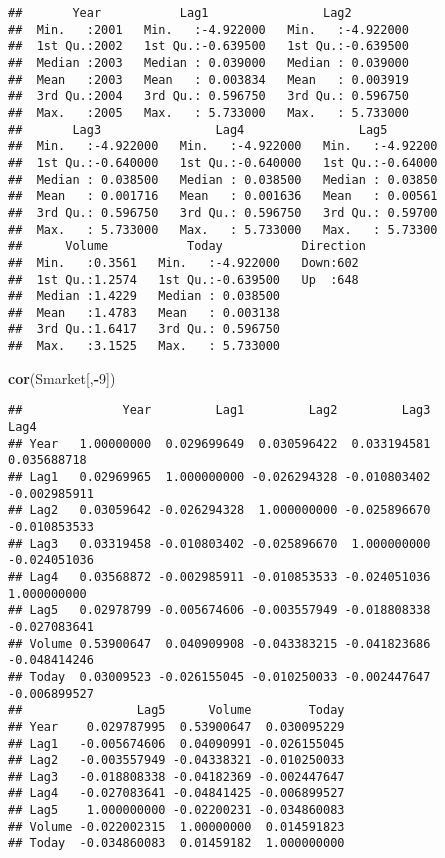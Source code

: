 \documentclass[]{article}
\newenvironment{Shaded}{\begin{snugshade}}{\end{snugshade}}
\newcommand{\KeywordTok}[1]{\textcolor[rgb]{0.13,0.29,0.53}{\textbf{#1}}}
\newcommand{\DecValTok}[1]{\textcolor[rgb]{0.00,0.00,0.81}{#1}}
\newcommand{\OperatorTok}[1]{\textcolor[rgb]{0.81,0.36,0.00}{\textbf{#1}}}
\newcommand{\NormalTok}[1]{#1}
\begin{document}
\begin{verbatim}
##       Year           Lag1                Lag2          
##  Min.   :2001   Min.   :-4.922000   Min.   :-4.922000  
##  1st Qu.:2002   1st Qu.:-0.639500   1st Qu.:-0.639500  
##  Median :2003   Median : 0.039000   Median : 0.039000  
##  Mean   :2003   Mean   : 0.003834   Mean   : 0.003919  
##  3rd Qu.:2004   3rd Qu.: 0.596750   3rd Qu.: 0.596750  
##  Max.   :2005   Max.   : 5.733000   Max.   : 5.733000  
##       Lag3                Lag4                Lag5         
##  Min.   :-4.922000   Min.   :-4.922000   Min.   :-4.92200  
##  1st Qu.:-0.640000   1st Qu.:-0.640000   1st Qu.:-0.64000  
##  Median : 0.038500   Median : 0.038500   Median : 0.03850  
##  Mean   : 0.001716   Mean   : 0.001636   Mean   : 0.00561  
##  3rd Qu.: 0.596750   3rd Qu.: 0.596750   3rd Qu.: 0.59700  
##  Max.   : 5.733000   Max.   : 5.733000   Max.   : 5.73300  
##      Volume           Today           Direction 
##  Min.   :0.3561   Min.   :-4.922000   Down:602  
##  1st Qu.:1.2574   1st Qu.:-0.639500   Up  :648  
##  Median :1.4229   Median : 0.038500             
##  Mean   :1.4783   Mean   : 0.003138             
##  3rd Qu.:1.6417   3rd Qu.: 0.596750             
##  Max.   :3.1525   Max.   : 5.733000
\end{verbatim}

\begin{Shaded}
\begin{Highlighting}[]
\KeywordTok{cor}\NormalTok{(Smarket[,}\OperatorTok{-}\DecValTok{9}\NormalTok{])}
\end{Highlighting}
\end{Shaded}

\begin{verbatim}
##              Year         Lag1         Lag2         Lag3         Lag4
## Year   1.00000000  0.029699649  0.030596422  0.033194581  0.035688718
## Lag1   0.02969965  1.000000000 -0.026294328 -0.010803402 -0.002985911
## Lag2   0.03059642 -0.026294328  1.000000000 -0.025896670 -0.010853533
## Lag3   0.03319458 -0.010803402 -0.025896670  1.000000000 -0.024051036
## Lag4   0.03568872 -0.002985911 -0.010853533 -0.024051036  1.000000000
## Lag5   0.02978799 -0.005674606 -0.003557949 -0.018808338 -0.027083641
## Volume 0.53900647  0.040909908 -0.043383215 -0.041823686 -0.048414246
## Today  0.03009523 -0.026155045 -0.010250033 -0.002447647 -0.006899527
##                Lag5      Volume        Today
## Year    0.029787995  0.53900647  0.030095229
## Lag1   -0.005674606  0.04090991 -0.026155045
## Lag2   -0.003557949 -0.04338321 -0.010250033
## Lag3   -0.018808338 -0.04182369 -0.002447647
## Lag4   -0.027083641 -0.04841425 -0.006899527
## Lag5    1.000000000 -0.02200231 -0.034860083
## Volume -0.022002315  1.00000000  0.014591823
## Today  -0.034860083  0.01459182  1.000000000
\end{verbatim}
\end{document}
